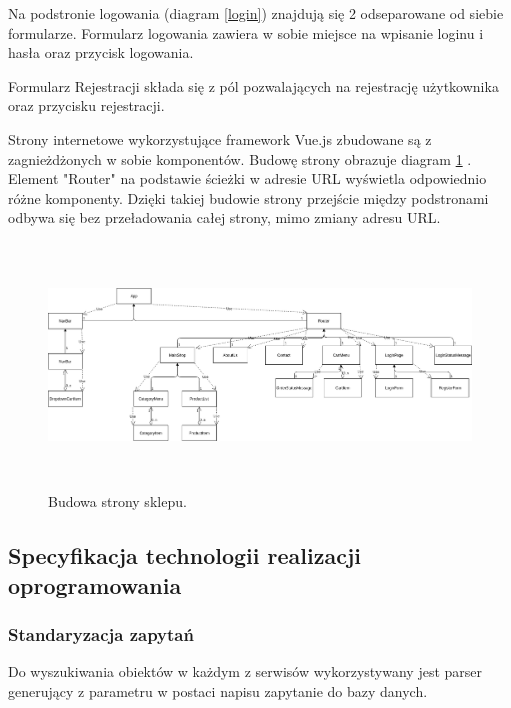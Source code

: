 \documentclass[11pt,a4paper,twoside]{article}
\begin{document}
\begin{enumerate}
Na podstronie logowania (diagram \ref{login}) znajdują się 2 odseparowane od siebie formularze. Formularz logowania zawiera w sobie miejsce na wpisanie loginu i hasła oraz przycisk logowania.

Formularz Rejestracji składa się z pól pozwalających na rejestrację użytkownika oraz przycisku rejestracji.
\end{enumerate}

Strony internetowe wykorzystujące framework Vue.js zbudowane są z zagnieżdżonych w sobie komponentów. Budowę strony obrazuje diagram \ref{frontendUML} . Element "Router" na podstawie ścieżki w adresie URL wyświetla odpowiednio różne komponenty. Dzięki takiej budowie strony przejście między podstronami odbywa się bez przeładowania całej strony, mimo zmiany adresu URL.

\begin{figure}[ht]
\caption{Budowa strony sklepu.}
\label{frontendUML}
\centering
\includegraphics[height=6.5cm, width=15.7cm]{FRONTEND_UML}
\end{figure}

\subsection{Specyfikacja technologii realizacji oprogramowania}

\subsubsection{Standaryzacja zapytań}
\label{stdZapytan}
Do wyszukiwania obiektów w każdym z serwisów wykorzystywany jest parser generujący z parametru w postaci napisu zapytanie do bazy danych.
\end{document}
